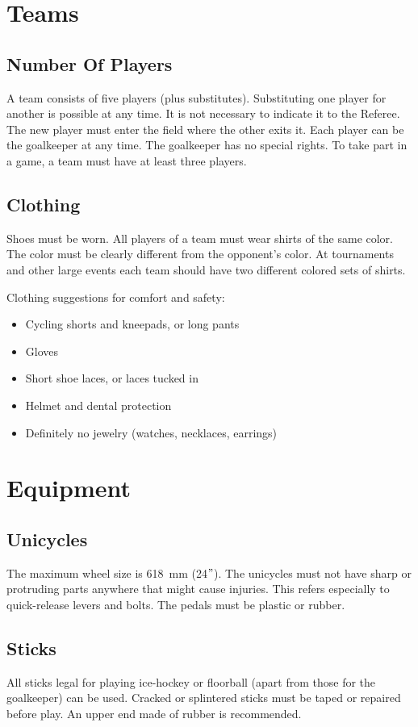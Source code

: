 \section{Teams}

\subsection{Number Of Players}
A team consists of five players (plus substitutes).
Substituting one player for another is possible at any time.
It is not necessary to indicate it to the Referee.
The new player must enter the field where the other exits it.
Each player can be the goalkeeper at any time.
The goalkeeper has no special rights.
To take part in a game, a team must have at least three players.

\subsection{Clothing}
Shoes must be worn.
All players of a team must wear shirts of the same color.
The color must be clearly different from the opponent's color.
At tournaments and other large events each team should have two different colored sets of shirts.

Clothing suggestions for comfort and safety:
\begin{itemize}
\item Cycling shorts and kneepads, or long pants
\item Gloves
\item Short shoe laces, or laces tucked in
\item Helmet and dental protection
\item Definitely no jewelry (watches, necklaces, earrings)
\end{itemize}

\section{Equipment}

\subsection{Unicycles}
The maximum wheel size is 618~mm (24$"$).
The unicycles must not have sharp or protruding parts anywhere that might cause injuries.
This refers especially to quick-release levers and bolts.
The pedals must be plastic or rubber.

\subsection{Sticks}
All sticks legal for playing ice-hockey or floorball (apart from those for the goalkeeper) can be used.
Cracked or splintered sticks must be taped or repaired before play.
An upper end made of rubber is recommended.

